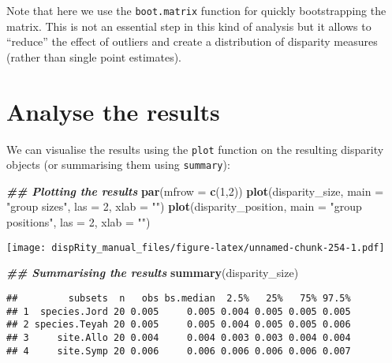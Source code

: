 \documentclass[
]{book}
\newenvironment{Shaded}{\begin{snugshade}}{\end{snugshade}}
\newcommand{\AttributeTok}[1]{\textcolor[rgb]{0.13,0.29,0.53}{#1}}
\newcommand{\DecValTok}[1]{\textcolor[rgb]{0.00,0.00,0.81}{#1}}
\newcommand{\DocumentationTok}[1]{\textcolor[rgb]{0.56,0.35,0.01}{\textbf{\textit{#1}}}}
\newcommand{\FunctionTok}[1]{\textcolor[rgb]{0.13,0.29,0.53}{\textbf{#1}}}
\newcommand{\NormalTok}[1]{#1}
\newcommand{\StringTok}[1]{\textcolor[rgb]{0.31,0.60,0.02}{#1}}
\begin{document}
Note that here we use the \texttt{boot.matrix} function for quickly bootstrapping the matrix.
This is not an essential step in this kind of analysis but it allows to ``reduce'' the effect of outliers and create a distribution of disparity measures (rather than single point estimates).

\hypertarget{analyse-the-results}{%
\section{Analyse the results}\label{analyse-the-results}}

We can visualise the results using the \texttt{plot} function on the resulting disparity objects (or summarising them using \texttt{summary}):

\begin{Shaded}
\begin{Highlighting}[]
\DocumentationTok{\#\# Plotting the results}
\FunctionTok{par}\NormalTok{(}\AttributeTok{mfrow =} \FunctionTok{c}\NormalTok{(}\DecValTok{1}\NormalTok{,}\DecValTok{2}\NormalTok{))}
\FunctionTok{plot}\NormalTok{(disparity\_size, }\AttributeTok{main =} \StringTok{"group sizes"}\NormalTok{, }\AttributeTok{las =} \DecValTok{2}\NormalTok{, }\AttributeTok{xlab =} \StringTok{""}\NormalTok{)}
\FunctionTok{plot}\NormalTok{(disparity\_position, }\AttributeTok{main =} \StringTok{"group positions"}\NormalTok{, }\AttributeTok{las =} \DecValTok{2}\NormalTok{, }\AttributeTok{xlab =} \StringTok{""}\NormalTok{)}
\end{Highlighting}
\end{Shaded}

\texttt{[image: dispRity\_manual\_files/figure-latex/unnamed-chunk-254-1.pdf]}

\begin{Shaded}
\begin{Highlighting}[]
\DocumentationTok{\#\# Summarising the results}
\FunctionTok{summary}\NormalTok{(disparity\_size)}
\end{Highlighting}
\end{Shaded}

\begin{verbatim}
##         subsets  n   obs bs.median  2.5%   25%   75% 97.5%
## 1  species.Jord 20 0.005     0.005 0.004 0.005 0.005 0.005
## 2 species.Teyah 20 0.005     0.005 0.004 0.005 0.005 0.006
## 3     site.Allo 20 0.004     0.004 0.003 0.003 0.004 0.004
## 4     site.Symp 20 0.006     0.006 0.006 0.006 0.006 0.007
\end{verbatim}
\end{document}
